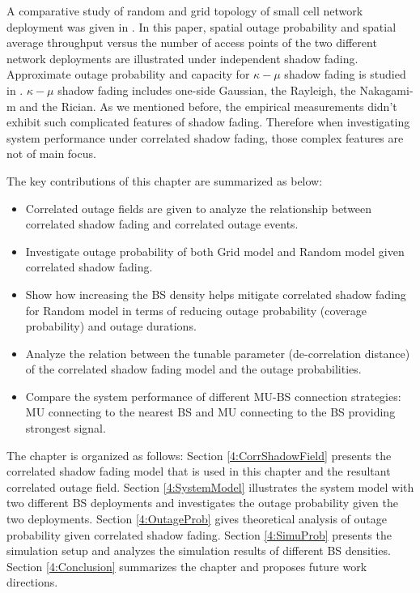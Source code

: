  \par A comparative study of random and grid topology of small cell network deployment was given in \cite{chen2012small}. In this paper, spatial outage probability and spatial average throughput versus the number of access points of the two different network deployments are illustrated under independent shadow fading. Approximate outage probability and capacity for $\kappa-\mu$ shadow fading is studied in \cite{kumar2015approximate}. $\kappa-\mu$ shadow fading includes one-side Gaussian, the Rayleigh, the Nakagami-m and the Rician. As we mentioned before, the empirical measurements didn't exhibit such complicated features of shadow fading. Therefore when investigating system performance under correlated shadow fading, those complex features are not of main focus.
 \par The key contributions of this chapter are summarized as below:
 \begin{itemize}
 \item Correlated outage fields are given to analyze the relationship between correlated shadow fading and correlated outage events. 
 \item Investigate outage probability of both Grid model and Random model given correlated shadow fading.
 \item Show how increasing the BS density helps mitigate correlated shadow fading for Random model in terms of reducing outage probability (coverage probability) and outage durations.
 \item Analyze the relation between the tunable parameter (de-correlation distance) of the correlated shadow fading model and the outage probabilities.
 \item Compare the system performance of different MU-BS connection strategies: MU connecting to the nearest BS and MU connecting to the BS providing strongest signal.
 \end{itemize}
 The chapter is organized as follows: Section \ref{4:CorrShadowField} presents the correlated shadow fading model that is used in this chapter and the resultant correlated outage field. Section \ref{4:SystemModel} illustrates the system model with two different BS deployments and investigates the outage probability given the two deployments. Section \ref{4:OutageProb} gives theoretical analysis of outage probability given correlated shadow fading. Section \ref{4:SimuProb} presents the simulation setup and analyzes the simulation results of different BS densities. Section \ref{4:Conclusion} summarizes the chapter and proposes future work directions.
 
